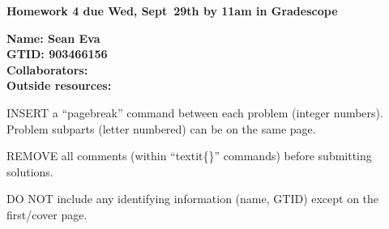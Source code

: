 \documentclass[11pt]{article}
\begin{document}
{\noindent\Large\textbf{Homework 4 due Wed, Sept~29th by 11am in Gradescope}}

\vspace{.25in}

{\large
\noindent
\textbf{Name: Sean Eva} \smallskip \\
\textbf{GTID: 903466156} \smallskip \\
\textbf{Collaborators:} \smallskip \\
\textbf{Outside resources:} \smallskip
}

\pagebreak 


INSERT a ``pagebreak'' command between each problem (integer numbers).
Problem subparts (letter numbered) can be on the same page.

REMOVE all comments (within ``textit\{\}'' commands) before submitting
solutions.

DO NOT include any identifying information (name, GTID) except on the
first/cover page.
\end{document}
